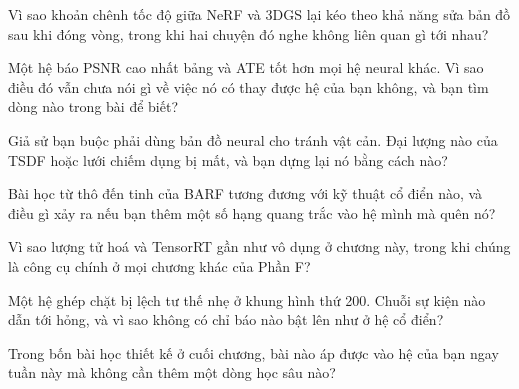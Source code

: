 \documentclass[../../deep_learning.tex]{subfiles}
\begin{document}
\begin{tukiem}
\item Vì sao khoản chênh tốc độ giữa NeRF và 3DGS lại kéo theo khả năng sửa bản đồ sau khi đóng vòng, trong khi hai chuyện đó nghe không liên quan gì tới nhau?
\item Một hệ báo PSNR cao nhất bảng và ATE tốt hơn mọi hệ neural khác. Vì sao điều đó vẫn chưa nói gì về việc nó có thay được hệ của bạn không, và bạn tìm dòng nào trong bài để biết?
\item Giả sử bạn buộc phải dùng bản đồ neural cho tránh vật cản. Đại lượng nào của TSDF hoặc lưới chiếm dụng bị mất, và bạn dựng lại nó bằng cách nào?
\item Bài học từ thô đến tinh của BARF tương đương với kỹ thuật cổ điển nào, và điều gì xảy ra nếu bạn thêm một số hạng quang trắc vào hệ mình mà quên nó?
\item Vì sao lượng tử hoá và TensorRT gần như vô dụng ở chương này, trong khi chúng là công cụ chính ở mọi chương khác của Phần F?
\item Một hệ ghép chặt bị lệch tư thế nhẹ ở khung hình thứ 200. Chuỗi sự kiện nào dẫn tới hỏng, và vì sao không có chỉ báo nào bật lên như ở hệ cổ điển?
\item Trong bốn bài học thiết kế ở cuối chương, bài nào áp được vào hệ của bạn ngay tuần này mà không cần thêm một dòng học sâu nào?
\end{tukiem}
\ifSubfilesClassLoaded{\printbibliography[title={Nguồn}]}{}
\end{document}
